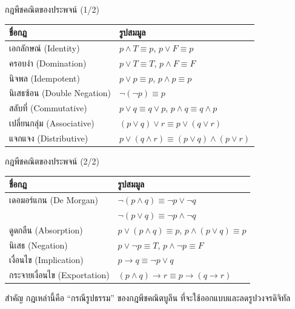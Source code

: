\begin{frame}{กฎพีชคณิตของประพจน์ (1/2)}
  \begin{center}\small
  \begin{tabular}{|l|l|}
    \hline
    \textbf{ชื่อกฎ} & \textbf{รูปสมมูล} \\ \hline
    เอกลักษณ์ (Identity) & $p \land T \equiv p$, \quad $p \lor F \equiv p$ \\ \hline
    ครอบงำ (Domination) & $p \lor T \equiv T$, \quad $p \land F \equiv F$ \\ \hline
    นิจพล (Idempotent) & $p \lor p \equiv p$, \quad $p \land p \equiv p$ \\ \hline
    นิเสธซ้อน (Double Negation) & $\neg(\neg p) \equiv p$ \\ \hline
    สลับที่ (Commutative) & $p \lor q \equiv q \lor p$, \quad $p \land q \equiv q \land p$ \\ \hline
    เปลี่ยนกลุ่ม (Associative) & $(p \lor q)\lor r \equiv p \lor (q \lor r)$ \\ \hline
    แจกแจง (Distributive) & $p \lor (q \land r) \equiv (p\lor q)\land(p\lor r)$ \\ \hline
  \end{tabular}
  \end{center}
\end{frame}

\begin{frame}{กฎพีชคณิตของประพจน์ (2/2)}
  \begin{center}\small
  \begin{tabular}{|l|l|}
    \hline
    \textbf{ชื่อกฎ} & \textbf{รูปสมมูล} \\ \hline
    เดอมอร์แกน (De Morgan) & $\neg(p \land q) \equiv \neg p \lor \neg q$ \\ \hline
                            & $\neg(p \lor q) \equiv \neg p \land \neg q$ \\ \hline
    ดูดกลืน (Absorption) & $p \lor (p \land q) \equiv p$, \quad $p \land (p \lor q) \equiv p$ \\ \hline
    นิเสธ (Negation) & $p \lor \neg p \equiv T$, \quad $p \land \neg p \equiv F$ \\ \hline
    เงื่อนไข (Implication) & $p \rightarrow q \equiv \neg p \lor q$ \\ \hline
    กระจายเงื่อนไข (Exportation) & $(p\land q)\rightarrow r \equiv p \rightarrow (q \rightarrow r)$ \\ \hline
  \end{tabular}
  \end{center}
  \vspace{0.4em}
  \begin{exampleblock}{สำคัญ}
    กฎเหล่านี้คือ ``กรณีรูปธรรม'' ของกฎพีชคณิตบูลีน ที่จะใช้ออกแบบและลดรูปวงจรดิจิทัล
  \end{exampleblock}
\end{frame}

